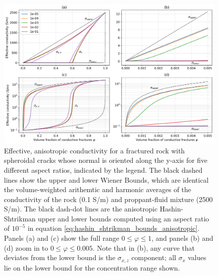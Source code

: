 \begin{figure}
    \begin{center}
    \includegraphics[width=\columnwidth]{figures/phys_prop_model/aligned_fractures.png}
    \end{center}
\caption{
    Effective, anisotropic conductivity for a fractured rock with spheroidal
    cracks whose normal is oriented along the y-axis for five different aspect ratios, indicated by the legend.
    The black dashed lines show the upper and lower
    Wiener Bounds, which are identical the volume-weighted arithemtic and harmonic averages of the
    conductivity of the rock (0.1 S/m) and proppant-fluid mixture (2500 S/m). The black dash-dot lines
    are the anisotropic Hashin-Shtrikman upper and lower bounds computed using an aspect ratio of $10^{-5}$ in
    equation \ref{eq:hashin_shtrikman_bounds_anisotropic}.
    Panels (a) and (c) show the
    full range $0 \leq \varphi \leq 1$, and panels (b) and (d) zoom in to $0 \leq \varphi \leq 0.005$.
    Note that in (b), any curve that deviates from the lower bound is the $\sigma_{x, z}$ component;
    all $\sigma_x$ values lie on the lower bound for the concentration range shown.
}
\label{fig:aligned_fractures}
\end{figure}
